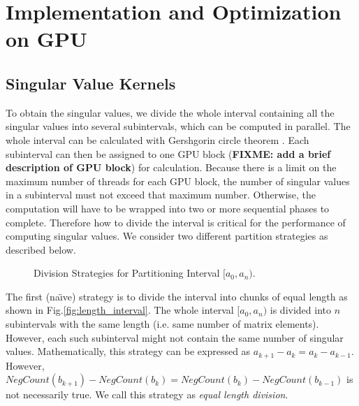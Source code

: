 \vspace{-0.1in}
\section{Implementation and Optimization on GPU} \label{sec:implementation}
\vspace{-0.1in}
\subsection{Singular Value Kernels} \label{sec_svalue}
\vspace{-0.1in}
To obtain the singular values, we divide the whole interval containing all the singular values into several subintervals, which can be computed in parallel. 
The whole interval can be calculated with Gershgorin circle theorem \cite{gershgorin}.
Each subinterval can then be assigned to one GPU block ({\bf FIXME: add a brief description of GPU block}) for calculation.
Because there is a limit on the maximum number of threads for each GPU block,
the number of singular values in a subinterval must not exceed that maximum number. Otherwise, the computation will have to be wrapped into two or more sequential phases to complete.
Therefore how to divide the interval is critical for the performance of
computing singular values. We consider two different partition
strategies as described below. 
\begin{figure}[hbpt]
\vspace{-0.3in}
\centering
\vspace{-0.1in}
  \caption{Division Strategies for Partitioning Interval  $[a_0, a_n)$.}
\vspace{-0.3in}
\end{figure}

The first (na\"{\i}ve) strategy is to divide the interval into chunks of equal length as shown in Fig.\ref{fig:length_interval}.
The whole interval $[a_0, a_n)$ is divided into $n$ subintervals with
the same length (i.e. same number of matrix elements). However, each
such subinterval might not contain the same number of singular values.
Mathematically, this strategy can be expressed as
$a_{k+1}-a_k = a_{k}-a_{k-1}$. However, $NegCount(b_{k+1})-NegCount(b_{k}) = NegCount(b_{k})-NegCount(b_{k-1})$ is not necessarily true. We call this strategy as {\it equal length division}.

